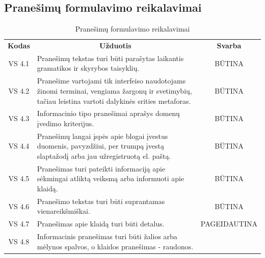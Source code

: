 \documentclass{VUMIFPSkursinis}
\begin{document}
\subsection{Pranešimų formulavimo reikalavimai}
\begin{center}
	\begin{table}[H]
	\caption{Pranešimų formulavimo reikalavimai}
	\begin{tabular}{|p{2cm}|p{11cm}|p{2cm}|}
	\hline
	    \rowcolor{lightgray}
	    \multicolumn{3}{|c|}{Pranešimų formulavimo reikalavimai}\\
	\hline
		\multicolumn{1}{|c|}{{\bfseries Kodas}}&
		\multicolumn{1}{|c|}{ {\bfseries Užduotis}}&
		\multicolumn{1}{|c|}{{\bfseries Svarba}}\\		
	\hline
		\multicolumn{1}{|c|}{VS 4.1}&
		\multicolumn{1}{|p{12,6cm}|}{Pranešimų tekstas turi būti parašytas laikantis gramatikos ir skyrybos taisyklių.}& 
		\multicolumn{1}{|c|}{BŪTINA}\\
	\hline
		\multicolumn{1}{|c|}{VS 4.2}&
		\multicolumn{1}{|p{12,5cm}|}{Pranešime vartojami tik interfeiso naudotojams žinomi terminai, vengiama žargonų ir svetimybių, tačiau leistina vartoti dalykinės srities metaforas.}& 
		\multicolumn{1}{|c|}{BŪTINA}\\
	\hline
		\multicolumn{1}{|c|}{VS 4.3}&
		\multicolumn{1}{|p{12,5cm}|}{Informacinio tipo pranešimai aprašys domenų įvedimo kriterijus.}& 
		\multicolumn{1}{|c|}{BŪTINA}\\
	\hline
		\multicolumn{1}{|c|}{VS 4.4}&
		\multicolumn{1}{|p{12,5cm}|}{Pranešimų langai įspės apie blogai įvestus duomenis, pavyzdžiui, per trumpą įvestą slaptažodį arba jau užregistruotą el. paštą.}& 
		\multicolumn{1}{|c|}{BŪTINA}\\
	\hline
		\multicolumn{1}{|c|}{VS 4.5}&
		\multicolumn{1}{|p{12,5cm}|}{Pranešimas turi pateikti informaciją apie sėkmingai atliktą veiksmą arba informuoti apie klaidą.}& 
		\multicolumn{1}{|c|}{BŪTINA}\\
	\hline
		\multicolumn{1}{|c|}{VS 4.6}&
		\multicolumn{1}{|p{12,5cm}|}{Pranešimo tekstas turi būti suprantamas vienareikšmiškai.}& 
		\multicolumn{1}{|c|}{BŪTINA}\\
	\hline
		\multicolumn{1}{|c|}{VS 4.7}&
		\multicolumn{1}{|p{12,5cm}|}{Pranešimas apie klaidą turi būti detalus.}& 
		\multicolumn{1}{|p{1.5cm}|}{PAGEIDAUTINA}\\
	\hline
		\multicolumn{1}{|c|}{VS 4.8}&
		\multicolumn{1}{|p{12,5cm}|}{Informacinis pranešimas turi būti žalios arba mėlynos spalvos, o klaidos pranešimas - raudonos.}& 

\end{tabular}
\end{table}
\end{center}
\end{document}
